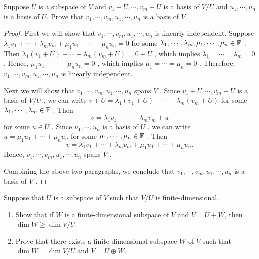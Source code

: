 \documentclass{article}
\begin{document}
\begin{problem}[3E-15]
	Suppose $U$ is a subspace of $V$ and $v_1 + U, \cdots, v_m + U$ is a basis
	of $V/U$ and $u_1, \cdots, u_n$ is a basis of $U$. Prove that
	$v_1, \cdots, v_m, u_1, \cdots, u_n$ is a basis of $V$.
\end{problem}

\begin{proof}
	First we will show that \( v_1, \cdots, v_m, u_1, \cdots, u_n \) is linearly independent. Suppose \( \lambda_1v_1+\cdots+\lambda_mv_m+\mu_1u_1+\cdots+\mu_nu_n=0 \) for some \( \lambda_1,\cdots,\lambda_m,\mu_1,\cdots,\mu_n\in\mathbb{F} \) . Then \( \lambda_1(v_1+U)+\cdots+\lambda_m(v_m+U)=0+U \) , which implies \( \lambda_1=\cdots=\lambda_m=0 \) . Hence, \( \mu_1u_1+\cdots+\mu_nu_n=0 \) , which implies \( \mu_1=\cdots=\mu_n=0 \) . Therefore, \( v_1, \cdots, v_m, u_1, \cdots, u_n \) is linearly independent.\par
	Next we will show that \( v_1, \cdots, v_m, u_1, \cdots, u_n \) spans \( V \) . Since \( v_1+U, \cdots, v_m+U \) is a basis of \( V/U \) , we can write \( v+U=\lambda_1(v_1+U)+\cdots+\lambda_m(v_m+U) \) for some \( \lambda_1,\cdots,\lambda_m\in\mathbb{F} \) . Then
	\[ v=\lambda_1v_1+\cdots+\lambda_mv_m+u \] for some \( u\in U \) . Since \( u_1, \cdots, u_n \) is a basis of \( U \) , we can write \( u=\mu_1u_1+\cdots+\mu_nu_n \) for some \( \mu_1,\cdots,\mu_n\in\mathbb{F} \) . Then
	\[ v=\lambda_1v_1+\cdots+\lambda_mv_m+\mu_1u_1+\cdots+\mu_nu_n. \]
	Hence, \( v_1, \cdots, v_m, u_1, \cdots, u_n \) spans \( V \) .\par
	Combining the above two paragraphs, we conclude that \( v_1, \cdots, v_m, u_1, \cdots, u_n \) is a basis of \( V \) .
\end{proof}

\begin{problem}[3E-18]
	Suppose that $U$ is a subspace of $V$ such that $V/U$ is finite-dimensional.
	\begin{enumerate}[label=(\alph*)]
		\item Show that if $W$ is a finite-dimensional subspace of $V$ and $V = U + W$, then $\dim W \geq \dim V/U$.
		\item Prove that there exists a finite-dimensional subspace $W$ of $V$ such that $\dim W = \dim V/U$ and $V = U \oplus W$.
	\end{enumerate}
\end{problem}
\end{document}
